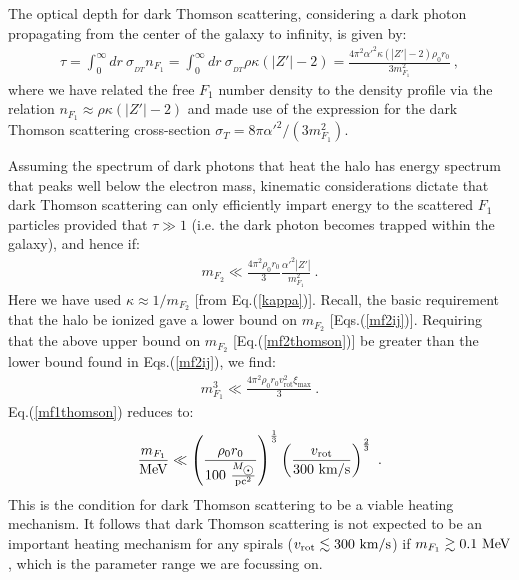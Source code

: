 \documentclass[12pt]{article}
\begin{document}
{{The optical depth for dark Thomson scattering, considering a dark photon
propagating from the center of the galaxy to infinity, is given by:
%
\begin{eqnarray}
\tau = \int _0 ^{\infty} dr \ \sigma _{_{DT}}n _{F_1} = \int _0
^{\infty} dr \ \sigma _{_{DT}}\rho \kappa (|Z'|-2) = \frac{4\pi
^2{\alpha '} ^2\kappa(|Z'|-2)\rho _0r _0}{3m _{F_1} ^2} \ ,
\label{opticaldepthdark}
\end{eqnarray}
%
where we have related the free $F_1$ number density to the density
profile via the relation $n _{F_1} \approx \rho \kappa (|Z'|-2)$ and
made use of the expression for the dark Thomson scattering cross-section
$\sigma _T = 8\pi{\alpha '} ^2/(3m _{F_1} ^2)$.

Assuming the spectrum of dark photons that heat the halo has energy
spectrum that peaks well below the electron mass, kinematic
considerations dictate that dark Thomson scattering can only efficiently
impart energy to the scattered $F_1$ particles provided that $\tau \gg
1$ (i.e. the dark photon becomes trapped within the galaxy), and hence
if:
%
\begin{eqnarray}
m _{F_2} \ll \frac{4\pi ^2\rho _0r _0}{3}\frac{{\alpha '} ^2|Z'|}{m
_{F_1} ^2} \ .
\label{mf2thomson}
\end{eqnarray}
%
Here we have used $\kappa \approx 1/m _{F_2}$ [from Eq.(\ref{kappa})].
Recall, the basic requirement that the halo be ionized gave a lower
bound on $m _{F_2}$ [Eqs.(\ref{mf2ij})]. Requiring that the above upper
bound on $m _{F_2}$ [Eq.(\ref{mf2thomson})] be greater than the lower
bound found in Eqs.(\ref{mf2ij}), we find:
%
\begin{eqnarray}
m _{F_1} ^3 \ll \frac{4\pi ^2\rho _0r _0v _{\text{rot}} ^2\xi
_{\max}}{3} \ .
\label{mf1thomson}
\end{eqnarray}
%
Eq.(\ref{mf1thomson}) reduces to:
%
\begin{eqnarray}
\frac{m _{F_1}}{{\rm MeV}} \ll \left ( \frac{\rho _0r _0}{100 \ \frac{M
_{\astrosun}}{{\rm pc ^2}}} \right ) ^{\frac{1}{3}}\left ( \frac{v
_{\text{rot}}}{300 \ \rm km/s} \right )^{\frac{2}{3}} \ .
\end{eqnarray}
%
This is the condition for dark Thomson scattering to be a viable heating
mechanism. It follows that dark Thomson scattering is not expected to be
an important
heating mechanism for any spirals ($v _{\text{rot}} \lesssim 300 \ \rm
km/s$) if $m _{F_1} \gtrsim 0.1 \ \rm MeV$, which is the parameter range
we are focussing on.

\vskip 1.7cm

}}
\end{document}
